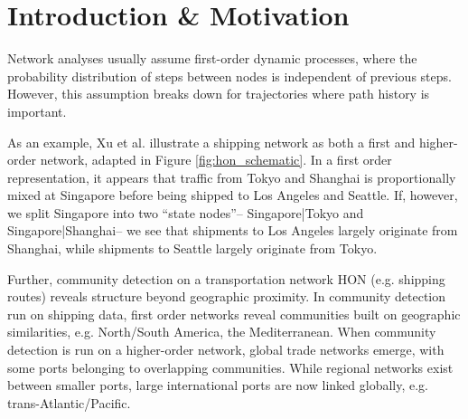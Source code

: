 \documentclass[sigconf]{acmart}
\begin{document}

\section{Introduction \& Motivation}
Network analyses usually assume first-order dynamic processes, where the probability distribution of steps between nodes is independent of previous steps. However, this assumption breaks down for trajectories where path history is important.

As an example, Xu et al. illustrate a shipping network as both a first and higher-order network, adapted in Figure \ref{fig:hon_schematic}\cite{Xu2016}. In a first order representation, it appears that traffic from Tokyo and Shanghai is proportionally mixed at Singapore before being shipped to Los Angeles and Seattle. If, however, we split Singapore into two ``state nodes''-- Singapore|Tokyo and Singapore|Shanghai-- we see that shipments to Los Angeles largely originate from Shanghai, while shipments to Seattle largely originate from Tokyo.

Further, community detection on a transportation network HON (e.g. shipping routes) reveals structure beyond geographic proximity. In community detection run on shipping data, first order networks reveal communities built on geographic similarities, e.g. North/South America, the Mediterranean. When community detection is run on a higher-order network, global trade networks emerge, with some ports belonging to overlapping communities. While regional networks exist between smaller ports, large international ports are now linked globally, e.g. trans-Atlantic/Pacific.\cite{Xu2016}
\end{document}
